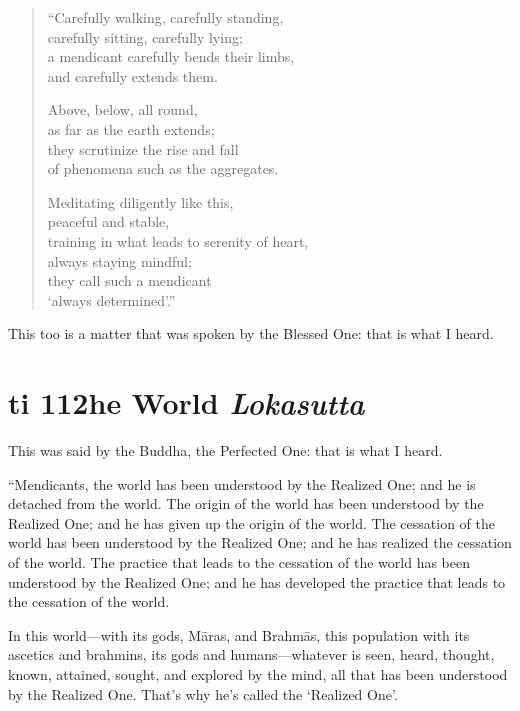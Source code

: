 \documentclass[12pt,openany]{book}%
\newcommand*{\suttatitleacronym}[1]{\smaller[2]{#1}\vspace*{.3em}}
\newcommand*{\suttatitletranslation}[1]{\linebreak{#1}}
\newcommand*{\suttatitleroot}[1]{\linebreak\smaller[2]\itshape{#1}}
\newcommand*{\tocacronym}[1]{\hspace*{-3.3em}{#1}\quad}
\newcommand*{\toctranslation}[1]{#1}
\newcommand*{\tocroot}[1]{(\textit{#1})}
\begin{document}
\begin{verse}%
“Carefully walking, carefully standing, \\
carefully sitting, carefully lying; \\
a mendicant carefully bends their limbs, \\
and carefully extends them. 

Above, below, all round, \\
as far as the earth extends; \\
they scrutinize the rise and fall \\
of phenomena such as the aggregates. 

Meditating diligently like this, \\
peaceful and stable, \\
training in what leads to serenity of heart, \\
always staying mindful; \\
they call such a mendicant \\
‘always determined’.” 

%
\end{verse}

This too is a matter that was spoken by the Blessed One: that is what I heard. 

%
\section*{{\suttatitleacronym Iti 112}{\suttatitletranslation The World }{\suttatitleroot Lokasutta}}
\addcontentsline{toc}{section}{\tocacronym{Iti 112} \toctranslation{The World } \tocroot{Lokasutta}}

This was said by the Buddha, the Perfected One: that is what I heard. 

“Mendicants, the world has been understood by the Realized One; and he is detached from the world. The origin of the world has been understood by the Realized One; and he has given up the origin of the world. The cessation of the world has been understood by the Realized One; and he has realized the cessation of the world. The practice that leads to the cessation of the world has been understood by the Realized One; and he has developed the practice that leads to the cessation of the world. 

In this world—with its gods, \textsanskrit{Māras}, and \textsanskrit{Brahmās}, this population with its ascetics and brahmins, its gods and humans—whatever is seen, heard, thought, known, attained, sought, and explored by the mind, all that has been understood by the Realized One. That’s why he’s called the ‘Realized One’. 
\end{document}
